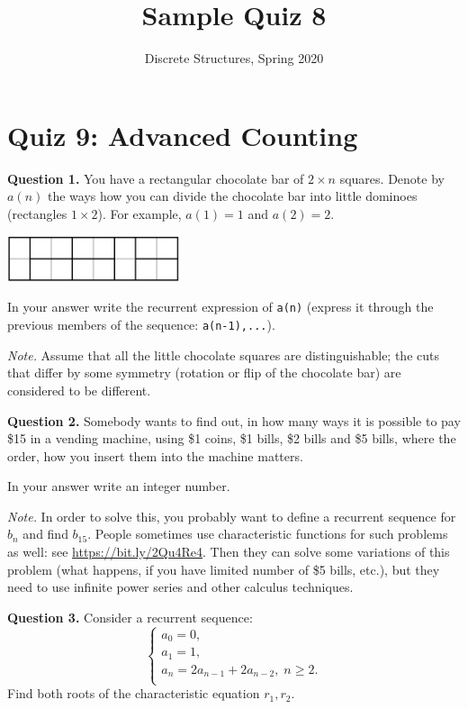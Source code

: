 \documentclass[jou]{apa6}
\title{Sample Quiz 8}
\author{Discrete Structures, Spring 2020}
\affiliation{RBS}
\begin{document}

\twocolumn
\section{Quiz 9: Advanced Counting}

\vspace{10pt}
{\bf Question 1.} 
You have a rectangular chocolate bar of $2 \times n$ squares. 
Denote by $a(n)$ the ways how you can divide the chocolate bar into 
little dominoes (rectangles $1 \times 2$). 
For example, $a(1) = 1$ and $a(2) = 2$. 
\begin{center}
\includegraphics[width=2in]{DominoTiling.png}
\end{center}

In your answer write the recurrent expression of {\tt a(n)} (express it through the previous members
of the sequence: {\tt a(n-1),...}).

{\em Note.} Assume that all the little
chocolate squares are distinguishable; the cuts that differ by 
some symmetry (rotation or flip of the chocolate bar) are considered to be different.


\vspace{10pt}
{\bf Question 2.}
Somebody wants to find out, in how many ways it is possible to pay \$15 in a vending machine, using 
\$1 coins, \$1 bills, \$2 bills and \$5 bills, where the order, how you insert them into the machine matters.

In your answer write an integer number.

{\em Note.} In order to solve this, you probably want to define a 
recurrent sequence for $b_n$ and 
find $b_{15}$. People sometimes use characteristic functions for such problems as well:
see \url{https://bit.ly/2Qu4Re4}. Then they can solve some variations of this
problem (what happens, if you have limited number of \$5 bills, etc.), but they need to use
infinite power series and other calculus techniques.

\vspace{10pt}
{\bf Question 3.}
Consider a recurrent sequence: 
$$\left\{ \begin{array}{l}
a_0 = 0,\\
a_1 = 1, \\
a_n = 2a_{n-1} + 2a_{n-2},\;n\geq 2.\\
\end{array} \right.$$
Find both roots of the characteristic equation $r_1,r_2$. 
\end{document}
